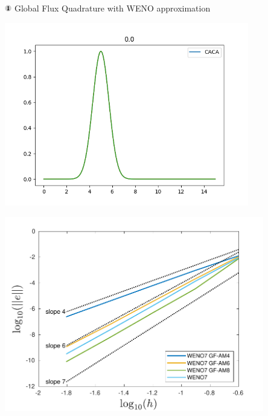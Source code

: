 \begin{frame}[t]{\includegraphics[width=0.3cm]{circle1} Global Flux Quadrature  with WENO approximation}
{	
	\begin{minipage}{0.5\textwidth}
		\centering\includegraphics[width=0.8\textwidth]{../figs/WENO-FD/figures/Burgers/MMS/initial} 
	\end{minipage}\hfill
	\begin{minipage}{0.5\textwidth}
		\centering\includegraphics[width=0.85\textwidth]{../figs/WENO-FD/figures/Burgers/MMS/weno7_AM_MMS_conv} 
	\end{minipage}
} 
 

\end{frame}

